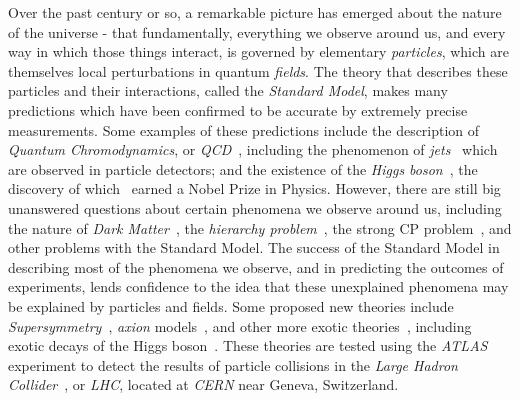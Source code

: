Over the past century or so, a remarkable picture has emerged about the nature of the universe - that fundamentally, everything we observe around us, and every way in which those things interact, is governed by elementary \textit{particles}, which are themselves local perturbations in quantum \textit{fields}.
The theory that describes these particles and their interactions, called the \textit{Standard Model}, makes many predictions which have been confirmed to be accurate by extremely precise measurements.
Some examples of these predictions include the description of \textit{Quantum Chromodynamics}, or \textit{QCD}~\cite{Gell-Mann:2015noa,Fritzsch:1973pi,Fritzsch:1972jv,Ali:2010tw}, including the phenomenon of \textit{jets}~\cite{Drell:1969wb,Politzer:1973fx,Blankenbecler:1972cd,Ali:2010tw} which are observed in particle detectors; and the existence of the \textit{Higgs boson}~\cite{Englert:1964et,Higgs:1964pj,Higgs:1964ia,Guralnik:1964eu}, the discovery of which~\cite{HIGG-2012-27,CMS-HIG-12-028} earned a Nobel Prize in Physics\cite{Nobel2013}.
However, there are still big unanswered questions about certain phenomena we observe around us, including the nature of \textit{Dark Matter}~\cite{Trimble:1987ee,Bertone:2010zza,darkmatter}, the \textit{hierarchy problem}~\cite{Csaki:2016kln,deGouvea:2014xba,Nilles:1982dy}, the strong CP problem~\cite{Dine:2000cj,Peccei:1977hh}, and other problems with the Standard Model.
The success of the Standard Model in describing most of the phenomena we observe, and in predicting the outcomes of experiments, lends confidence to the idea that these unexplained phenomena may be explained by particles and fields.
Some proposed new theories include \textit{Supersymmetry}~\cite{wess_bagger_2009,Wess:1984jr,Lykken:1996xt,Quevedo:2010ui,Strassler:2003qg,Peskin:1997qi,Seiberg:1994pq,Intriligator:2007cp}, \textit{axion} models~\cite{Peccei:1977hh,Baluni:1978rf,Crewther:1979pi,Peccei:1977ur,Weinberg:1977ma,Wilczek:1977pj}, and other more exotic theories~\cite{Lykken:2010mc,Lee:2019zbu,Ellis:2009pz,Ellis:2012zz,Virdee:2016,Halkiadakis:2014qda}, including exotic decays of the Higgs boson~\cite{Curtin:2013fra}.
These theories are tested using the \textit{ATLAS} experiment\cite{PERF-2007-01} to detect the results of particle collisions in the \textit{Large Hadron Collider}~\cite{CERN-Brochure-2017-002-Eng,Pettersson:291782,Evans:313675,Evans:2008zzb}, or \textit{LHC}, located at \textit{CERN} near Geneva, Switzerland.

